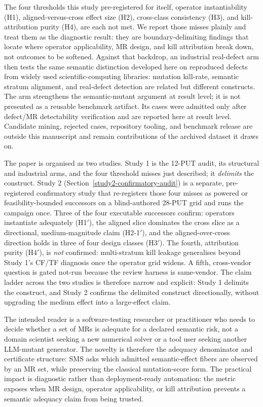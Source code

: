 \documentclass[manuscript,screen,review]{acmart}
\begin{document}
The four thresholds this study pre-registered for itself, operator
instantiability (H1), aligned-versus-cross effect size (H2), cross-class
consistency (H3), and kill-attribution purity (H4), are each not met. We
report those misses plainly and treat them as the diagnostic result:
they are boundary-delimiting findings that locate where operator
applicability, MR design, and kill attribution break down, not outcomes
to be softened. Against that backdrop, an industrial real-defect arm
then tests the same semantic distinction developed here on reproduced
defects from widely used scientific-computing libraries: mutation
kill-rate, semantic stratum alignment, and real-defect detection are
related but different constructs. The arm strengthens the semantic-mutant argument at result
level; it is not presented as a reusable benchmark artifact. Its cases
were admitted only after defect/MR detectability verification and are
reported here at result level. Candidate mining, rejected cases,
repository tooling, and benchmark release are outside this manuscript
and remain contributions of the archived dataset it draws on.

The paper is organised as two studies. Study 1 is the 12-PUT audit,
its structural and industrial arms, and the four threshold misses just
described; it \emph{delimits} the construct. Study 2
(Section~\ref{study2-confirmatory-audit}) is a separate, pre-registered
confirmatory study that re-registers those four misses as powered or
feasibility-bounded successors on a blind-authored 28-PUT grid and runs
the campaign once. Three of the four executable successors confirm:
operators instantiate adequately (H1\('\)), the aligned slice dominates
the cross slice as a directional, medium-magnitude claim (H2-1\('\)), and
the aligned-over-cross direction holds in three of four design classes
(H3\('\)). The fourth, attribution purity (H4\('\)), is \emph{not}
confirmed: multi-stratum kill leakage generalises beyond Study 1's
CF/TF diagnosis once the operator grid widens. A fifth, cross-vendor
question is gated not-run because the review harness is same-vendor.
The claim ladder across the two studies is therefore narrow and
explicit: Study 1 delimits the construct, and Study 2 confirms the
delimited construct directionally, without upgrading the medium effect
into a large-effect claim.

The intended reader is a software-testing researcher or practitioner who
needs to decide whether a set of MRs is adequate for a declared semantic
risk, not a domain scientist seeking a new numerical solver or a tool
user seeking another LLM-mutant generator. The novelty is therefore the
adequacy denominator and certificate structure: SMS asks which admitted
semantic-effect fibers are observed by an MR set, while preserving the
classical mutation-score form. The practical impact is diagnostic rather
than deployment-ready automation: the metric exposes when MR design,
operator applicability, or kill attribution prevents a semantic adequacy
claim from being trusted.
\end{document}
